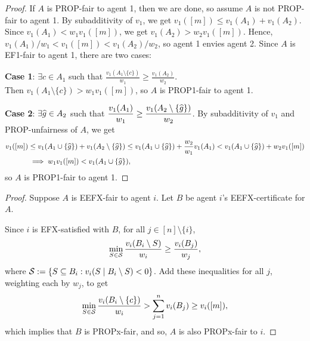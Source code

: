 \begin{proof}
If $A$ is PROP-fair to agent 1, then we are done,
so assume $A$ is not PROP-fair to agent 1.
By subadditivity of $v_1$, we get
$v_1([m]) \le v_1(A_1) + v_1(A_2)$.
Since $v_1(A_1) < w_1v_1([m])$, we get $v_1(A_2) > w_2v_1([m])$.
Hence, $v_1(A_1)/w_1 < v_1([m]) < v_1(A_2)/w_2$, so agent 1 envies agent 2.
Since $A$ is EF1-fair to agent 1, there are two cases:

\textbf{Case 1}: $\exists c \in A_1$ such that
    $\displaystyle \frac{v_1(A_1 \setminus \{c\})}{w_1} \ge \frac{v_1(A_2)}{w_2}$.
\\ Then $v_1(A_1 \setminus \{c\}) > w_1v_1([m])$, so $A$ is PROP1-fair to agent 1.

\textbf{Case 2}: $\exists \widehat{g} \in A_2$ such that
    $\displaystyle \frac{v_1(A_1)}{w_1} \ge \frac{v_1(A_2 \setminus \{\widehat{g}\})}{w_2}$.
By subadditivity of $v_1$ and PROP-unfairness of $A$, we get
\begin{align*}
v_1([m]) &\le v_1(A_1 \cup \{\widehat{g}\}) + v_1(A_2 \setminus \{\widehat{g}\})
    \relax\le v_1(A_1 \cup \{\widehat{g}\}) + \frac{w_2}{w_1}v_1(A_1)
    \relax< v_1(A_1 \cup \{\widehat{g}\}) + w_2v_1([m])
\\ &\implies w_1 v_1([m]) < v_1(A_1 \cup \{\widehat{g}\}),
\end{align*}
so $A$ is PROP1-fair to agent 1.
\end{proof}

\begin{proof}
Suppose $A$ is EEFX-fair to agent $i$.
Let $B$ be agent $i$'s EEFX-certificate for $A$.

Since $i$ is EFX-satisfied with $B$, for all $j \in [n] \setminus \{i\}$,
\[ \min_{S \in \mathcal{S}} \frac{v_i(B_i \setminus S)}{w_i} \ge \frac{v_i(B_j)}{w_j}, \]
where $\mathcal{S} := \{S \subseteq B_i: v_i(S \mid B_i \setminus S) < 0\}$.
Add these inequalities for all $j$, weighting each by $w_j$, to get
\[ \min_{S \in \mathcal{S}} \frac{v_i(B_i \setminus \{c\})}{w_i} > \sum_{j=1}^n v_i(B_j) \ge v_i([m]), \]
which implies that $B$ is PROPx-fair,
and so, $A$ is also PROPx-fair to $i$.
\end{proof}

